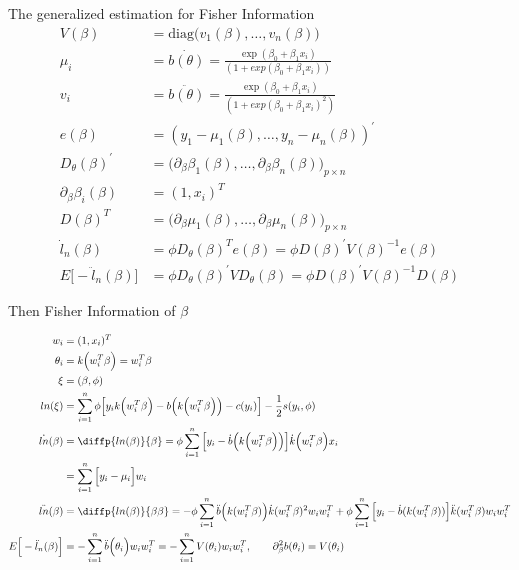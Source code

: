 \begin{itemize}
The generalized estimation for Fisher Information
\begin{align*}
V(\beta) &= \text{diag} \Big( v_1(\beta), …, v_n(\beta) \Big) \\
\mu_i &= \dot{b(\theta)} = \frac{\exp(\beta_0 + \beta_1 x_i)}{(1 + exp(\beta_0+ \beta_1 x_i))}\\
v_i &= \ddot{b(\theta)} = \frac{\exp(\beta_0 + \beta_1 x_i)}{(1 + exp(\beta_0+ \beta_1 x_i)^2)}\\
e(\beta) &= (y_1 - \mu_1(\beta), …, y_n- \mu_n(\beta))^{'} \\
D_{\theta} (\beta)^{'} &= \Big( \partial_{\beta} \beta_1(\beta),…,  \partial_{\beta} \beta_n(\beta)\Big)_{p \times n} \\
\partial_{\beta} \beta_i(\beta) &= (1, x_i)^T \\
D (\beta)^{T} &= \Big( \partial_{\beta} \mu_1(\beta),…,  \partial_{\beta} \mu_n(\beta) \Big)_{p \times n} \\
\dot{l}_n(\beta) &= \phi D_{\theta}(\beta)^{T} e(\beta) = \phi D(\beta)^{'} V(\beta)^{-1} e(\beta) \\
E \Big[ -\ddot{l}_n(\beta) \Big] &= \phi D_{\theta}(\beta)^{'} V D_{\theta}(\beta) = \phi D(\beta)^{'} V(\beta)^{-1} D(\beta) 
\end{align*}

Then Fisher Information of $\beta$

\begin{align*}
w_i &= (1, x_i)^T \\
\theta_i & = k \Big(w_i^{T}\beta \Big) = w_i^{T} \beta \\
\xi &= (\beta, \phi)\\
ln(\xi) &= \sum_{i=1}^n \phi \Big[ y_i k \Big(w_i^{T}\beta \Big) - b \Big( k \Big(w_i^{T} \beta \Big)  \Big) - c(y_i) \Big] - \frac{1}{2} s(y_i, \phi) \\
\dot{ln}(\beta) &= \diffp{ln(\beta) }{\beta} = \phi \sum_{i=1}^n \Big[ y_i - \dot{b} \Big( k \Big(w_i^{T} \beta \Big)  \Big)  \Big] \dot{k} \Big(w_i^{T}\beta \Big) x_i \\
&= \sum_{i=1}^n \Big[ y_i - \mu_i \Big] w_i\\
\ddot{ln}(\beta) &= \diffp{ln(\beta) }{\beta \beta} = -\phi \sum_{i=1}^n \ddot{b} \Big( k(w_i^{T} \beta) \Big) \dot{k}(w_i^{T}\beta)^2 w_i w_i^{T}  + \phi \sum_{i=1}^n \Big[y_i - \dot{b}(k(w_i^{T} \beta)) \Big] \ddot{k}(w_i^{T}  \beta) w_i  w_i^{T} \\
E \Big[ -\ddot{l}_n(\beta) \Big] &= -\sum_{i=1}^n \ddot{b} \Big(\theta_i \Big) w_i w_i^{T}= -\sum_{i=1}^n V(\theta_i) w_i w_i^{T}, \qquad \partial^2_{\beta}{{b(\theta_i)}} = V(\theta_i)
\end{align*}


\end{itemize}
